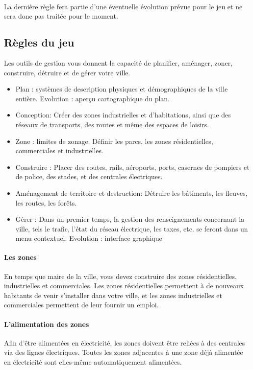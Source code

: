 \paragraph{}
La dernière règle fera partie d'une éventuelle évolution prévue pour le jeu et ne sera donc pas traitée pour le moment.

\subsection{Règles du jeu}
Les outils de gestion vous donnent la capacité de planifier, aménager, zoner, construire, détruire et de gérer votre ville.

\begin{itemize}
\item Plan : systèmes de description physiques et démographiques de la ville entière.
\subitem Evolution : aperçu cartographique du plan.
\item Conception: Créer des zones industrielles et d'habitations, ainsi que des réseaux de transports, des routes et même des espaces de loisirs.
\item Zone : limites de zonage. Définir les parcs, les zones résidentielles, commerciales et industrielles.
\item Construire : Placer des routes, rails, aéroports, ports, casernes de pompiers et de police, des stades, et des centrales électriques.
\item Aménagement de territoire et destruction: Détruire les bâtiments, les fleuves, les routes, les forêts.
\item Gérer : Dans un premier temps, la gestion des renseignements concernant la ville, tels le trafic, l'état du réseau électrique, les taxes, etc. se feront dans un menu contextuel. \subitem Evolution : interface graphique
\end{itemize}

\paragraph{Les zones}
En temps que maire de la ville, vous devez construire des zones résidentielles, industrielles et commerciales. Les zones résidentielles permettent à de nouveaux habitants de venir s'installer dans votre ville, et les zones industrielles et commerciales permettent de leur fournir un emploi.
\paragraph{L'alimentation des zones}
Afin d'être alimentées en électricité, les zones doivent être reliées à des centrales via des lignes électriques. Toutes les zones adjacentes à une zone déjà alimentée en électricité sont elles-même automatiquement alimentées.
